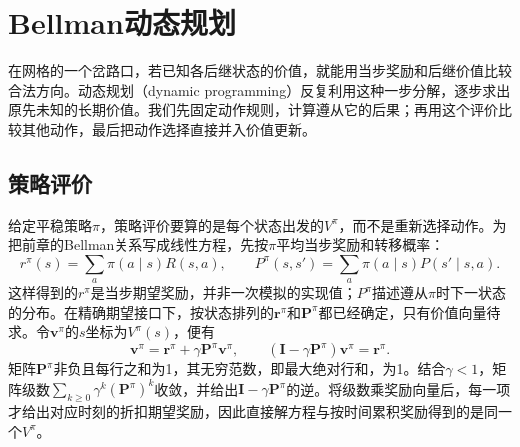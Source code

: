 \section{Bellman动态规划}
\label{sec:rl-planning-dp}

在网格的一个岔路口，若已知各后继状态的价值，就能用当步奖励和后继价值比较合法方向。动态规划（dynamic programming）反复利用这种一步分解，逐步求出原先未知的长期价值。我们先固定动作规则，计算遵从它的后果；再用这个评价比较其他动作，最后把动作选择直接并入价值更新。

\subsection{策略评价}
\label{sec:rl-planning-evaluation}

给定平稳策略$\pi$，策略评价要算的是每个状态出发的$V^\pi$，而不是重新选择动作。为把前章的Bellman关系写成线性方程，先按$\pi$平均当步奖励和转移概率：
\[
 r^\pi(s)=\sum_a\pi(a\mid s)R(s,a),\qquad
 P^\pi(s,s')=\sum_a\pi(a\mid s)P(s'\mid s,a).
\]
这样得到的$r^\pi$是当步期望奖励，并非一次模拟的实现值；$P^\pi$描述遵从$\pi$时下一状态的分布。在精确期望接口下，按状态排列的$\bm r^\pi$和$\bm P^\pi$都已经确定，只有价值向量待求。令$\bm v^\pi$的$s$坐标为$V^\pi(s)$，便有
\begin{equation}
 \bm v^\pi=\bm r^\pi+\gamma\bm P^\pi\bm v^\pi,\qquad
 (\bm I-\gamma\bm P^\pi)\bm v^\pi=\bm r^\pi.
 \label{eq:rl-planning-linear-evaluation}
\end{equation}
矩阵$\bm P^\pi$非负且每行之和为1，其无穷范数，即最大绝对行和，为1。结合$\gamma<1$，矩阵级数$\sum_{k\geq0}\gamma^k(\bm P^\pi)^k$收敛，并给出$\bm I-\gamma\bm P^\pi$的逆。将级数乘奖励向量后，每一项才给出对应时刻的折扣期望奖励，因此直接解方程与按时间累积奖励得到的是同一个$V^\pi$。

